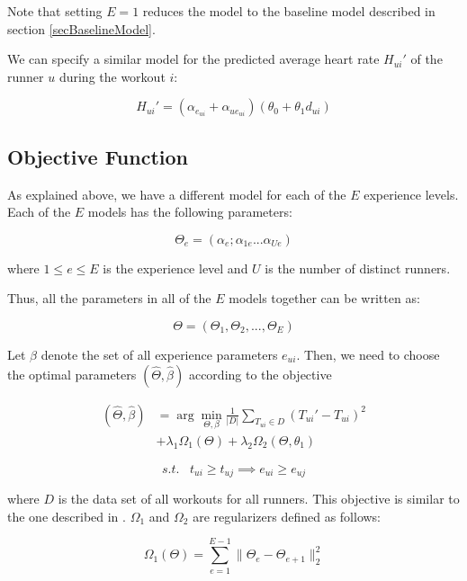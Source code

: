 \documentclass{acm_proc_article-sp}
\begin{document}
Note that setting $E = 1$ reduces the model to the baseline model described in section \ref{secBaselineModel}.

We can specify a similar model for the predicted average heart rate $H_{ui}'$ of the runner $u$ during the workout $i$:

\begin{equation}
\label{eqnModelAvgHr}
H_{ui}' = (\alpha_{e_{ui}} + \alpha_{ue_{ui}})(\theta_0 + \theta_1 d_{ui})
\end{equation}

\subsection{Objective Function}
As explained above, we have a different model for each of the $E$ experience levels. Each of the $E$ models has the following parameters:

$$\Theta_e = (\alpha_e; \alpha_{1e}...\alpha_{Ue})$$

where $1 \leq e \leq E$ is the experience level and $U$ is the number of distinct runners.

Thus, all the parameters in all of the $E$ models together can be written as:

$$\Theta = (\Theta_1, \Theta_2,..., \Theta_E)$$

Let $\beta$ denote the set of all experience parameters $e_{ui}$. Then, we need to choose the optimal parameters $(\hat{\Theta}, \hat{\beta})$ according to the objective


\begin{align}
\label{eqnObjective}
(\hat{\Theta}, \hat{\beta})  &= \arg\min_{\Theta,\beta}\frac{1}{|D|} \sum_{T_{ui} \in D}(T_{ui}' - T_{ui})^2 \nonumber \\
 & + \lambda_1\Omega_1(\Theta) + \lambda_2\Omega_2(\Theta, \theta_1)
\end{align}

$$s.t. \; \; \; t_{ui} \geq t_{uj} \implies e_{ui} \geq e_{uj} $$

where $D$ is the data set of all workouts for all runners. This objective is similar to the one described in \cite{www13}. $\Omega_1$ and $\Omega_2$ are regularizers defined as follows:

$$\Omega_1(\Theta) = \sum_{e=1}^{E-1}{\|\Theta_e - \Theta_{e+1}\|_2^2}$$
\end{document}

